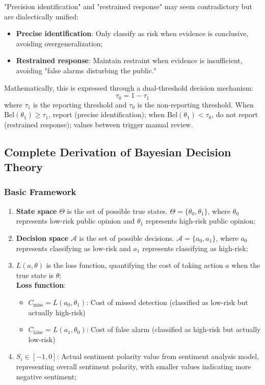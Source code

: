 \documentclass[11pt,a4paper]{report}
\begin{document}
"Precision identification" and "restrained response" may seem contradictory but are dialectically unified:
\begin{itemize}
    \item \textbf{Precise identification}: Only classify as risk when evidence is conclusive, avoiding overgeneralization;
    \item \textbf{Restrained response}: Maintain restraint when evidence is insufficient, avoiding "false alarms disturbing the public."
\end{itemize}

Mathematically, this is expressed through a dual-threshold decision mechanism:
\[
\tau_0 = 1 - \tau_1
\]
where $\tau_1$ is the reporting threshold and $\tau_0$ is the non-reporting threshold. When $\mathrm{Bel}(\theta_1) \geq \tau_1$, report (precise identification); when $\mathrm{Bel}(\theta_1) < \tau_0$, do not report (restrained response); values between trigger manual review.

\subsection{Complete Derivation of Bayesian Decision Theory}

\subsubsection{Basic Framework}

\begin{enumerate}
    \item \textbf{State space} $\Theta$ is the set of possible true states. $\Theta = \{\theta_0, \theta_1\}$, where $\theta_0$ represents low-risk public opinion and $\theta_1$ represents high-risk public opinion;
    \item \textbf{Decision space} $\mathcal{A}$ is the set of possible decisions. $\mathcal{A} = \{a_0, a_1\}$, where $a_0$ represents classifying as low-risk and $a_1$ represents classifying as high-risk;
    \item $L(a,\theta)$ is the loss function, quantifying the cost of taking action $a$ when the true state is $\theta$;\\
    \textbf{Loss function}:
    \begin{itemize}[leftmargin=*]
        \item $C_{\text{miss}} = L(a_0, \theta_1)$: Cost of missed detection (classified as low-risk but actually high-risk)
        \item $C_{\text{false}} = L(a_1, \theta_0)$: Cost of false alarm (classified as high-risk but actually low-risk)
    \end{itemize}
    \item $S_i \in [-1, 0]$: Actual sentiment polarity value from sentiment analysis model, representing overall sentiment polarity, with smaller values indicating more negative sentiment;
\end{enumerate}
\end{document}

